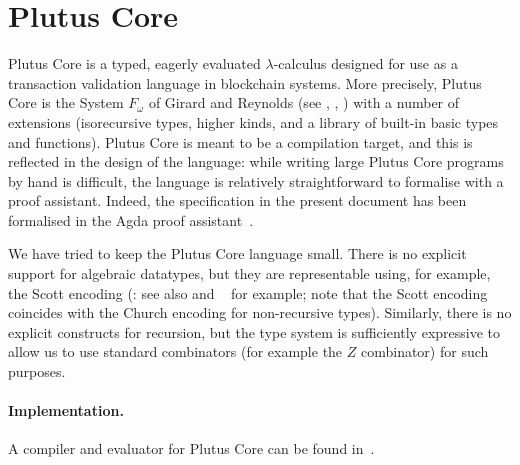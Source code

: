 \documentclass[a4paper]{article}
\begin{document}
%


\maketitle

\thispagestyle{plain}
\pagestyle{plain}



\section{Plutus Core}
Plutus Core is a typed, eagerly evaluated $\lambda$-calculus designed
for use as a transaction validation language in blockchain
systems. More precisely, Plutus Core is the System $F_\omega$ of
Girard and Reynolds (see \citep{Girard-thesis},
\citep{Reynolds-type-structure}, \citep[\S30]{Pierce:TAPL}) with a
number of extensions (isorecursive types, higher kinds, and a library
of built-in basic types and functions).  Plutus Core is meant to be a
compilation target, and this is reflected in the design of the
language: while writing large Plutus Core programs by hand is
difficult, the language is relatively straightforward to formalise
with a proof assistant.  Indeed, the specification in the present
document has been formalised in the Agda proof assistant~\citep{Agda}.

We have tried to keep the Plutus Core language small. There is no explicit
support for algebraic datatypes, but they are representable using, for example,
the Scott encoding (\citep{Scott-encoding}: see also \citep{Koopman:2014} and
~\citep{Geuvers-2014} for example; note that the Scott encoding coincides with
the Church encoding for non-recursive types). Similarly, there is no explicit
constructs for recursion, but the type system is sufficiently expressive to
allow us to use standard combinators (for example the $Z$ combinator) for such
purposes.

\paragraph{Implementation.} A compiler and evaluator for Plutus Core can be found
in~\citep{Plutus-exe-repo}.
\end{document}
